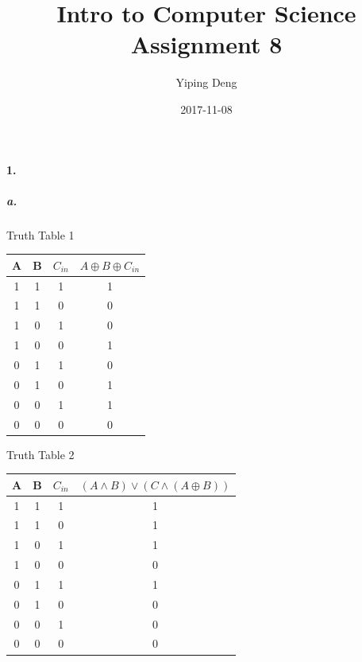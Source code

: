 \documentclass{article}
\title{Intro to Computer Science Assignment 8}
\date{2017-11-08}
\author{Yiping Deng}
\begin{document}
\maketitle
\paragraph{1.}
\subparagraph{a.} Truth Table 1\\
\begin{center}
        \begin{tabular}{ |c|c|c|c|}
            \hline
            A & B & $C_{in}$ & $A \oplus B \oplus C_{in}$ \\
            \hline
            1 & 1 & 1 & 1 \\
            1 & 1 & 0 & 0 \\
            1 & 0 & 1 & 0 \\
            1 & 0 & 0 & 1 \\
            0 & 1 & 1 & 0 \\
            0 & 1 & 0 & 1 \\
            0 & 0 & 1 & 1 \\
            0 & 0 & 0 & 0 \\
            \hline
        \end{tabular}
\end{center}
Truth Table 2 \\
\begin{center}
    \begin{tabular} { |c|c|c|c|}
        \hline
        A & B & $C_{in}$ & $(A \land B) \lor (C \land (A \oplus B))$ \\
        \hline
        1 & 1 & 1 & 1 \\
        1 & 1 & 0 & 1 \\
        1 & 0 & 1 & 1 \\
        1 & 0 & 0 & 0 \\
        0 & 1 & 1 & 1 \\
        0 & 1 & 0 & 0 \\
        0 & 0 & 1 & 0 \\
        0 & 0 & 0 & 0 \\
        \hline
    \end{tabular}
\end{center}
\end{document}
